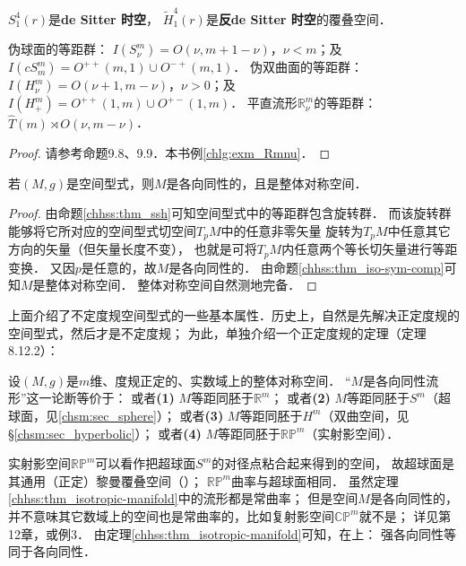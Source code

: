 $S^4_1(r)$是{\bfseries\heiti de Sitter 时空}，
$\widetilde{H}^4_1(r)$是{\bfseries\heiti 反de Sitter 时空}的覆叠空间．



\begin{proposition}\label{chhss:thm_ssh}
    伪球面的等距群：
    $I(S^m_\nu)=O(\nu,m+1-\nu)$，$ \nu < m$；及
    $I(cS^m_m)=O^{++}(m,1)\cup O^{-+}(m,1)$．
    伪双曲面的等距群：
    $I(H^m_\nu)=O(\nu+1,m-\nu)$，$ \nu > 0$；及
    $I(H^m_+)=O^{++}(1,m)\cup O^{+-}(1,m)$．
    平直流形$\mathbb{R}^m_\nu$的等距群：$\hat{T}(m)\rtimes O(\nu,m-\nu)$．
\end{proposition}
\begin{proof}
    请参考\parencite{oneill1983}命题9.8、9.9．本书例\ref{chlg:exm_Rmnu}．
\end{proof}

\begin{proposition}\label{chhss:thm_SF-isotropic}
    若$(M,g)$是空间型式，则$M$是各向同性的，且是整体对称空间．
\end{proposition}
\begin{proof}
    由命题\ref{chhss:thm_ssh}可知空间型式中的等距群包含旋转群．
    而该旋转群能够将它所对应的空间型式切空间$T_pM$中的任意非零矢量
    旋转为$T_pM$中任意其它方向的矢量（但矢量长度不变），
    也就是可将$T_pM$内任意两个等长切矢量进行等距变换．
    又因$p$是任意的，故$M$是各向同性的．
    由命题\ref{chhss:thm_iso-sym-comp}可知$M$是整体对称空间．
    整体对称空间自然测地完备．
\end{proof}

上面介绍了不定度规空间型式的一些基本属性．历史上，自然是先解决正定度规的空间型式，然后才是不定度规；
为此，单独介绍一个正定度规的定理（\parencite{wolf_SCC-2011}定理8.12.2）：

\begin{theorem}\label{chhss:thm_isotropic-manifold}
    设$(M,g)$是$m$维、度规正定的、实数域上的整体对称空间．
    “$M$是{\kaishu 各向同性流形}”这一论断等价于：
    或者{\bfseries (1)} $M$等距同胚于$\mathbb{R}^m$；
    或者{\bfseries (2)} $M$等距同胚于$S^m$（超球面，见\ref{chsm:sec_sphere}）；
    或者{\bfseries (3)} $M$等距同胚于$H^m$（双曲空间，见\S\ref{chsm:sec_hyperbolic}）；
    或者{\bfseries (4)} $M$等距同胚于$\mathbb{RP}^m$（实射影空间）．
\end{theorem}

实射影空间$\mathbb{RP}^m$可以看作把超球面$S^m$的对径点粘合起来得到的空间，
故超球面是其通用（正定）黎曼覆叠空间（\parencite[\S 2.5]{wolf_SCC-2011}）；
$\mathbb{RP}^m$曲率与超球面相同．
虽然定理\ref{chhss:thm_isotropic-manifold}中的流形都是常曲率；
但是空间$M$是各向同性的，并不意味其它数域上的空间也是常曲率的，比如复射影空间$\mathbb{CP}^m$就不是；
详见\parencite{wolf_SCC-2011}第12章，或\parencite[\S 4.1]{mengdj-dckj-2005}例3．
由定理\ref{chhss:thm_isotropic-manifold}可知，在上：
强各向同性等同于各向同性．

